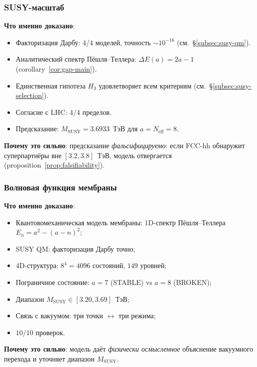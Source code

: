 \documentclass[11pt,a4paper]{article}
\theoremstyle{definition}
\begin{document}
\subsubsection{SUSY-масштаб}

\textbf{Что именно доказано}:
\begin{itemize}
    \item Факторизация Дарбу: 4/4 моделей, точность $\sim 10^{-16}$
          (см.~\S\ref{subsec:susy-qm}).
    \item Аналитический спектр Пёшля--Теллера:
          $\Delta E(a) = 2a - 1$ (corollary~\ref{cor:gap-main}).
    \item Единственная гипотеза $H_3$ удовлетворяет всем
          критериям (см.~\S\ref{subsec:susy-selection}).
    \item Согласие с LHC: 4/4 пределов.
    \item Предсказание: $M_{\text{SUSY}} = 3.6933$~ТэВ
          для $a = N_{\text{eff}} = 8$.
\end{itemize}

\medskip\noindent
\textbf{Почему это сильно}: предсказание
\emph{фальсифицируемо}: если FCC-hh обнаружит суперпартнёры
вне $[3.2, 3.8]$~ТэВ, модель отвергается
(proposition~\ref{prop:falsifiability}).

\subsubsection{Волновая функция мембраны}

\textbf{Что именно доказано}:
\begin{itemize}
    \item Квантовомеханическая модель мембраны:
          1D-спектр Пёшля--Теллера $E_n = a^2 - (a-n)^2$;
    \item SUSY QM: факторизация Дарбу точно;
    \item 4D-структура: $8^4 = 4096$ состояний, $149$ уровней;
    \item Пограничное состояние: $a = 7$ (STABLE) vs $a = 8$ (BROKEN);
    \item Диапазон $M_{\text{SUSY}} \in [3.20, 3.69]$~ТэВ;
    \item Связь с вакуумом: три точки $\leftrightarrow$ три режима;
    \item $10/10$ проверок.
\end{itemize}

\medskip\noindent
\textbf{Почему это сильно}: модель даёт \emph{физически осмысленное}
объяснение вакуумного перехода и уточняет диапазон $M_{\text{SUSY}}$.
\end{document}
